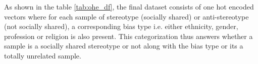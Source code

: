 As shown in the table \ref{tab:ohe_df}, the final dataset consists of one hot encoded vectors where for each sample of stereotype (socially shared) or anti-stereotype (not socially shared), a corresponding bias type i.e. either ethnicity, gender, profession or religion is also present. This categorization thus answers whether a sample is a socially shared stereotype or not along with the bias type or its a totally unrelated sample.


